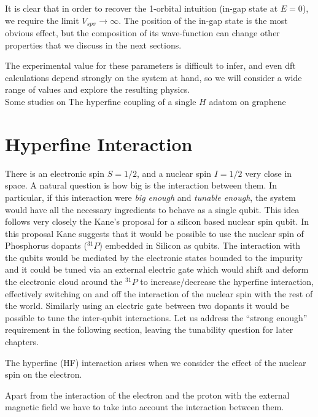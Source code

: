 It is clear that in order to recover the 1-orbital intuition (in-gap state at $E=0$), we require the limit $V_{sp\sigma}\to\infty$. The position of the in-gap state is the most obvious effect, but the composition of its wave-function can change other properties that we discuss in the next sections.


The experimental value for these parameters is difficult to infer\cite{}, and even \ac{dft} calculations depend strongly on the system at hand, so we will consider a wide range of values and explore the resulting physics.\\


Some studies on\cite{Ranjbar2010}
The hyperfine coupling of a single $H$ adatom on graphene

\section{Hyperfine Interaction}
\label{sec:hyperfine}
There is an electronic spin $S=1/2$, and a nuclear spin $I=1/2$ very close in space. A natural question is how big is the interaction between them. In particular, if this interaction were \emph{big enough} and \emph{tunable enough}, the system would have all the necessary ingredients to behave as a single qubit.
This idea follows very closely the Kane's proposal for a silicon based nuclear spin qubit\cite{Kane1988}. In this proposal Kane suggests that it would be possible to use the nuclear spin of Phosphorus dopants ($^{31}P$) embedded in Silicon as qubits. The interaction with the qubits would be mediated by the electronic states bounded to the impurity and it could be tuned via an external electric gate which would shift and deform the electronic cloud around the $^{31}P$ to increase/decrease the hyperfine interaction, effectively switching on and off the interaction of the nuclear spin with the rest of the world.
Similarly using an electric gate between two dopants it would be possible to tune the inter-qubit interactions.
Let us address the ``strong enough'' requirement in the following section, leaving the tunability question for later chapters. 

The hyperfine (HF) interaction arises when we consider the effect of the nuclear spin on the electron.

Apart from the interaction of the electron and the proton with the external magnetic field we have to take into account the interaction between them.

